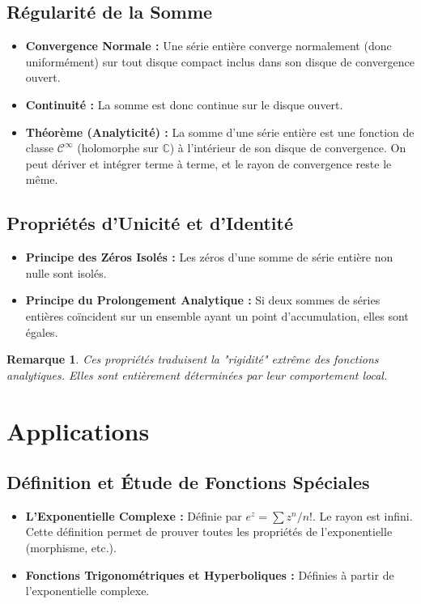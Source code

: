 \documentclass[12pt, a4paper, parskip=full]{report}
\theoremstyle{agregstyle}
\newtheorem{remark}[definition]{Remarque}
\begin{document}
\subsection{Régularité de la Somme}
\begin{itemize}
    \item \textbf{Convergence Normale :} Une série entière converge normalement (donc uniformément) sur tout disque compact inclus dans son disque de convergence ouvert.
    \item \textbf{Continuité :} La somme est donc continue sur le disque ouvert.
    \item \textbf{Théorème (Analyticité) :} La somme d'une série entière est une fonction de classe $\mathcal{C}^\infty$ (holomorphe sur $\mathbb{C}$) à l'intérieur de son disque de convergence. On peut dériver et intégrer terme à terme, et le rayon de convergence reste le même.
\end{itemize}
\subsection{Propriétés d'Unicité et d'Identité}
\begin{itemize}
    \item \textbf{Principe des Zéros Isolés :} Les zéros d'une somme de série entière non nulle sont isolés.
    \item \textbf{Principe du Prolongement Analytique :} Si deux sommes de séries entières coïncident sur un ensemble ayant un point d'accumulation, elles sont égales.
\end{itemize}
\begin{remark}
    Ces propriétés traduisent la "rigidité" extrême des fonctions analytiques. Elles sont entièrement déterminées par leur comportement local.
\end{remark}

\section{Applications}
\subsection{Définition et Étude de Fonctions Spéciales}
\begin{itemize}
    \item \textbf{L'Exponentielle Complexe :} Définie par $e^z = \sum z^n/n!$. Le rayon est infini. Cette définition permet de prouver toutes les propriétés de l'exponentielle (morphisme, etc.).
    \item \textbf{Fonctions Trigonométriques et Hyperboliques :} Définies à partir de l'exponentielle complexe.
\end{itemize}
\end{document}
